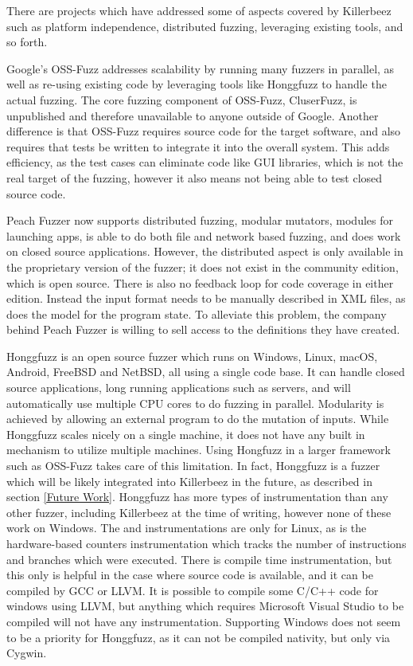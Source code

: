 There are projects which have addressed some of aspects covered by Killerbeez
such as platform independence, distributed fuzzing, leveraging existing tools,
and so forth.

Google's OSS-Fuzz\cite{ossfuzz} addresses scalability by running many fuzzers
in parallel, as well as re-using existing code by leveraging tools like
Honggfuzz to handle the actual fuzzing. The core fuzzing component of OSS-Fuzz,
CluserFuzz, is unpublished and therefore unavailable to anyone outside of
Google.  Another difference is that OSS-Fuzz requires source code for the
target software, and also requires that tests be written to integrate it
into the overall system. This adds efficiency, as the test cases can eliminate
code like GUI libraries, which is not the real target of the fuzzing, however
it also means not being able to test closed source code.

Peach Fuzzer\cite{peach} now supports distributed fuzzing, modular mutators,
modules for launching apps, is able to do both file and network based fuzzing,
and does work on closed source applications.  However, the distributed aspect
is only available in the proprietary version of the fuzzer; it does not exist
in the community edition, which is open source. There is also no feedback loop
for code coverage in either edition.  Instead the input format needs to be
manually described in XML files, as does the model for the program state. To
alleviate this problem, the company behind Peach Fuzzer is willing to sell
access to the definitions they have created.

Honggfuzz\cite{honggfuzz} is an open source fuzzer which runs on Windows, Linux,
macOS, Android, FreeBSD and NetBSD, all using a single code base. It can handle
closed source applications, long running applications such as servers, and will
automatically use multiple CPU cores to do fuzzing in parallel. Modularity is
achieved by allowing an external program to do the mutation of inputs. While
Honggfuzz scales nicely on a single machine, it does not have any built in
mechanism to utilize multiple machines.  Using Hongfuzz in a larger framework
such as OSS-Fuzz takes care of this limitation.  In fact, Honggfuzz is a fuzzer
which will be likely integrated into Killerbeez in the future, as described in
section \ref{Future Work}. Honggfuzz has more types of instrumentation than any
other fuzzer, including Killerbeez at the time of writing, however none of
these work on Windows. The \BTS{} and \IPT{} instrumentations are only for
Linux, as is the hardware-based counters instrumentation which tracks the
number of instructions and branches which were executed. There is compile time
instrumentation, but this only is helpful in the case where source code is
available, and it can be compiled by GCC or LLVM.  It is possible to compile
some C/C++ code for windows using LLVM, but anything which requires Microsoft
Visual Studio to be compiled will not have any instrumentation.  Supporting
Windows does not seem to be a priority for Honggfuzz, as it can not be compiled
nativity, but only via Cygwin.


